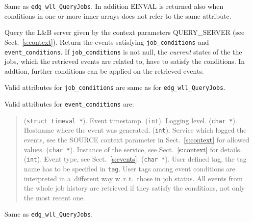 \documentclass{egee}
\def\LB{L\&B\xspace}
\def\wrt{w.\,r.\,t.\xspace}
\begin{document}
\Return
Same as \verb'edg_wll_QueryJobs'. In addition EINVAL is returned also
when conditions in one or more inner arrays does not refer to the same
attribute.


\Synopsis
{}

\Description
Query the \LB server given by the context parameters
QUERY\_SERVER (see Sect.~\ref{s:context}).
Return the events satisfying 
\verb'job_conditions' and \verb'event_conditions'.
If \verb'job_conditions' is not null, the \emph{current} states of the 
the jobs, which the retrieved events are related to, have to satisfy the 
conditions.
In addtion, further conditions can be applied on the retrieved events.

Valid attributes for \verb'job_conditions' are same as for
\verb'edg_wll_QueryJobs'.

Valid attributes for \verb'event_conditions' are:
\begin{quote}
\begin{description}
\qitem[TIME] (\verb'struct timeval *'). Event timestamp.
\qitem[LEVEL] (\verb'int'). Logging level.
\qitem[HOST] (\verb'char *'). Hostname where the event was generated.
\qitem[SOURCE] (\verb'int'). Service which logged the events,
see the SOURCE context parameter in Sect.~\ref{s:context} for allowed values.
\qitem[INSTANCE] (\verb'char *'). Instance of the service, see Sect.~\ref{s:context} for details.
 (\verb'int'). Event type, see Sect.~\ref{s:events}.
\qitem[USERTAG] (\verb'char *').
User defined tag, the tag name has to be specified in \verb'tag'.
User tags among event conditions are interpreted in a~different way
\wrt\ those in job status. 
All events from the whole job history are retrieved
if they satisfy the conditions, not only the most recent one.

\end{description}
\end{quote}

\Return
Same as \verb'edg_wll_QueryJobs'.

\Synopsis
{}
\end{document}
